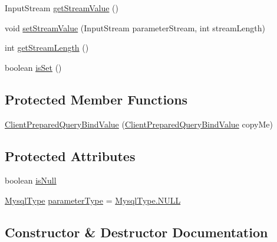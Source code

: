 \begin{DoxyCompactItemize}
\item 
Input\+Stream \mbox{\hyperlink{classcom_1_1mysql_1_1cj_1_1_client_prepared_query_bind_value_a57dcbdd8ef4f98c2142bf6c6ee217035}{get\+Stream\+Value}} ()
\item 
void \mbox{\hyperlink{classcom_1_1mysql_1_1cj_1_1_client_prepared_query_bind_value_a91a77d92aa03fd7a0ada64374a25e2fb}{set\+Stream\+Value}} (Input\+Stream parameter\+Stream, int stream\+Length)
\item 
int \mbox{\hyperlink{classcom_1_1mysql_1_1cj_1_1_client_prepared_query_bind_value_aa3af5bfb0e74d1101afa4f093fdce32b}{get\+Stream\+Length}} ()
\item 
boolean \mbox{\hyperlink{classcom_1_1mysql_1_1cj_1_1_client_prepared_query_bind_value_af2831a168b2afe1d429903340c13af2f}{is\+Set}} ()
\end{DoxyCompactItemize}
\subsection*{Protected Member Functions}
\begin{DoxyCompactItemize}
\item 
\mbox{\hyperlink{classcom_1_1mysql_1_1cj_1_1_client_prepared_query_bind_value_ad896429663b61815f28fdb813ebfd1d6}{Client\+Prepared\+Query\+Bind\+Value}} (\mbox{\hyperlink{classcom_1_1mysql_1_1cj_1_1_client_prepared_query_bind_value}{Client\+Prepared\+Query\+Bind\+Value}} copy\+Me)
\end{DoxyCompactItemize}
\subsection*{Protected Attributes}
\begin{DoxyCompactItemize}
\item 
boolean \mbox{\hyperlink{classcom_1_1mysql_1_1cj_1_1_client_prepared_query_bind_value_a5f070c408a6a65deaf0c2581f34cdfe9}{is\+Null}}
\item 
\mbox{\hyperlink{enumcom_1_1mysql_1_1cj_1_1_mysql_type}{Mysql\+Type}} \mbox{\hyperlink{classcom_1_1mysql_1_1cj_1_1_client_prepared_query_bind_value_aa529f8247427184b1dfc546a6d795165}{parameter\+Type}} = \mbox{\hyperlink{enumcom_1_1mysql_1_1cj_1_1_mysql_type_afd999a269aedd95acf6ae2453b95e2a3}{Mysql\+Type.\+N\+U\+LL}}
\end{DoxyCompactItemize}


\subsection{Constructor \& Destructor Documentation}
\mbox{\label{classcom_1_1mysql_1_1cj_1_1_client_prepared_query_bind_value_a1899881fc95dbd1b0335d20fee402ce1}} 

